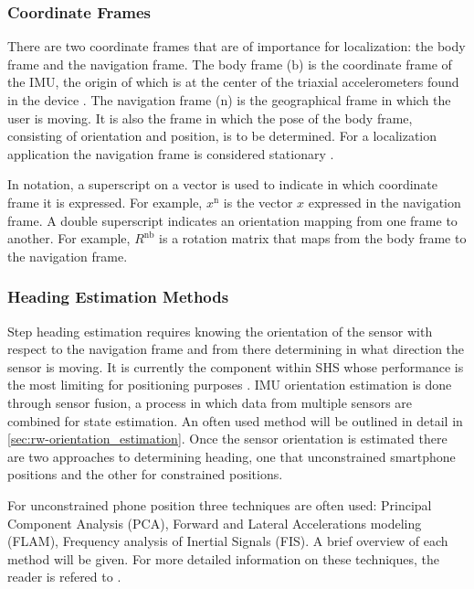 \subsubsection{Coordinate Frames}
There are two coordinate frames that are of importance for localization: the body frame and the navigation frame. The body frame ($\mathrm{b}$) is the coordinate frame of the IMU, the origin of which is at the center of the triaxial accelerometers found in the device \cite{Kok2017}. The navigation frame ($\mathrm{n}$) is the geographical frame in which the user is moving. It is also the frame in which the pose of the body frame, consisting of orientation and position, is to be determined. For a localization application the navigation frame is considered stationary \cite{Kok2017}.\par

In notation, a superscript on a vector is used to indicate in which coordinate frame it is expressed. For example, $x^\mathrm{n}$ is the vector $x$ expressed in the navigation frame. A double superscript indicates an orientation mapping from one frame to another. For example, $R^\mathrm{nb}$ is a rotation matrix that maps from the body frame to the navigation frame.

\subsubsection{Heading Estimation Methods}
Step heading estimation requires knowing the orientation of the sensor with respect to the navigation frame and from there determining in what direction the sensor is moving. It is currently the component within \ac{SHS} whose performance is the most limiting for positioning purposes \cite{Diez2018b, Qian2013,Combettes2017}. IMU orientation estimation is done through sensor fusion, a process in which data from multiple sensors are combined for state estimation. An often used method will be outlined in detail in \cref{sec:rw-orientation_estimation}.
Once the sensor orientation is estimated there are two approaches to determining heading, one that unconstrained smartphone positions and the other for constrained positions. 

For unconstrained phone position three techniques are often used: Principal Component Analysis (PCA), Forward and Lateral Accelerations modeling (FLAM), Frequency analysis of Inertial Signals (FIS). A brief overview of each method will be given. For more detailed information on these techniques, the reader is refered to \cite{Combettes2017}.

